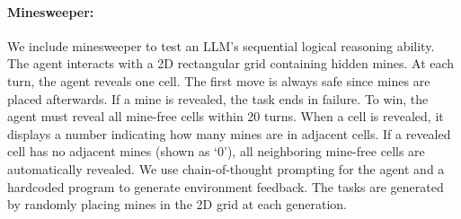 \paragraph{Minesweeper: } We include minesweeper to test an LLM's sequential logical reasoning ability. The agent interacts with a 2D rectangular grid containing hidden mines. At each turn, the agent reveals one cell. The first move is always safe since mines are placed afterwards. If a mine is revealed, the task ends in failure. To win, the agent must reveal all mine-free cells within 20 turns. When a cell is revealed, it displays a number indicating how many mines are in adjacent cells. If a revealed cell has no adjacent mines (shown as `0'), all neighboring mine-free cells are automatically revealed. We use chain-of-thought prompting for the agent and a hardcoded program to generate environment feedback. The tasks are generated by randomly placing mines in the 2D grid at each generation.

